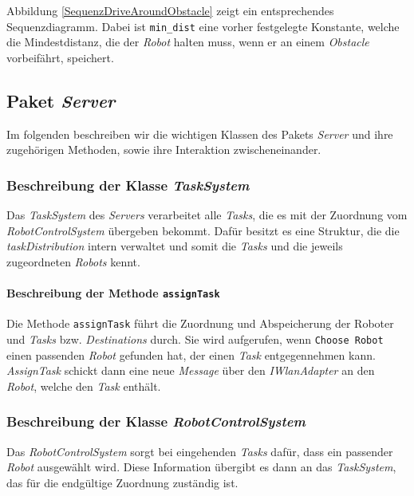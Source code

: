 			Abbildung \ref{SequenzDriveAroundObstacle} zeigt ein entsprechendes Sequenzdiagramm. Dabei ist \texttt{min\_dist} eine vorher festgelegte Konstante, welche die Mindestdistanz, die der \textit{Robot} halten muss, wenn er an einem \textit{Obstacle} vorbeifährt, speichert.
	
\pagebreak
	
\subsection{Paket \textit{Server}}
	Im folgenden beschreiben wir die wichtigen Klassen des Pakets \textit{Server} 
	und ihre zugehörigen Methoden, sowie ihre Interaktion zwischeneinander. 


	\subsubsection{Beschreibung der Klasse \textit{TaskSystem}}
		Das \emph{TaskSystem} des \emph{Servers} verarbeitet alle \emph{Tasks}, die es mit der Zuordnung vom \emph{RobotControlSystem} übergeben bekommt. Dafür besitzt es eine Struktur, die die \emph{taskDistribution} intern verwaltet und somit die \emph{Tasks} und die jeweils zugeordneten \emph{Robots} kennt.
		
			\paragraph{Beschreibung der Methode \texttt{assignTask}}
			Die Methode \texttt{assignTask} führt die Zuordnung und Abspeicherung der Roboter und \emph{Tasks} bzw. \emph{Destinations} durch. Sie wird aufgerufen, wenn \texttt{Choose Robot} einen passenden \textit{Robot} gefunden hat, der einen \textit{Task} entgegennehmen kann. \textit{AssignTask} schickt dann eine neue \textit{Message} über den \textit{IWlanAdapter} an den \textit{Robot}, welche den \textit{Task} enthält.
			
	\subsubsection{Beschreibung der Klasse \textit{RobotControlSystem}}
		Das \emph{RobotControlSystem} sorgt bei eingehenden \emph{Tasks} dafür, dass ein passender \emph{Robot} ausgewählt wird. Diese Information übergibt es dann an das \emph{TaskSystem}, das für die endgültige Zuordnung zuständig ist.
	
